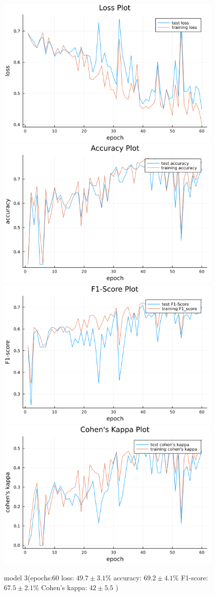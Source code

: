 \documentclass[
a4paper, 
12pt,
grayscalebody, %
abstract=on,
twoside, BCOR10mm, 12pt, DIV13,headinclude, footexclude, final, abstracton, openright
]{ibireprt}
\numberwithin{equation}{chapter}
\numberwithin{table}{chapter}
\numberwithin{figure}{chapter}
\numberwithin{algorithm}{chapter}
\numberwithin{example}{chapter}
\numberwithin{example}{chapter}
\begin{document}
\begin{figure}
	\includegraphics[width=0.4\linewidth]{loss_png_final_1_3.png}\hfill
	\includegraphics[width=0.4\linewidth]{accuracy_png_final_1_3.png}
	\\[\smallskipamount]
	\includegraphics[width=0.4\linewidth]{f1_score_png_final_1_3.png}\hfill
	\includegraphics[width=0.4\linewidth]{cohens_kappa_png_final_1_3.png}
	\caption{model 3(epochs:60 loss: $49.7\pm3.1\% $ accuracy: $69.2\pm4.1\%$ F1-score: $67.5\pm2.1\%$  Cohen's kappa: $42\pm5.5$ )}
\end{figure}
\end{document}
